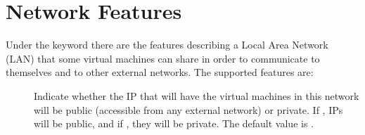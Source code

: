 \documentclass[letterpaper,10pt,english]{sphinxmanual}
\begin{document}
\section{Network Features}
\label{radl:network-features}
Under the keyword  there are the features describing a Local Area
Network (LAN) that some virtual machines can share in order to communicate
to themselves and to other external networks.
The supported features are:
\begin{description}
\item[{}] \leavevmode
Indicate whether the IP that will have the virtual machines in this network
will be public (accessible from any external network) or private.
If , IPs will be public, and if , they will be private.
The default value is .

\end{description}
\end{document}
